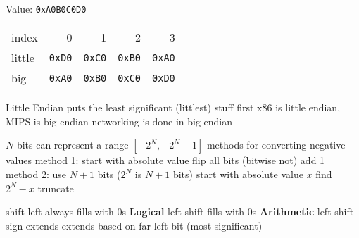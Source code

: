 \documentclass[12pt]{article}
\begin{document}
\begin{spacing}{0.8}
\begin{multicols*}{2}
\begin{flushleft}
\begin{outline}[longenum]

\\
Value: \verb|0xA0B0C0D0|\\
  \1 
  \begin{tabular}{l r r r r}
  index  & 0 & 1 & 2 & 3 \\
  little & \verb|0xD0| & \verb|0xC0| & \verb|0xB0| & \verb|0xA0| \\
  big    & \verb|0xA0| & \verb|0xB0| & \verb|0xC0| & \verb|0xD0| \\
  \end{tabular}
    \2 Little Endian puts the least significant (littlest) stuff first
  \1 x86 is little endian, MIPS is big endian
  \1 networking is done in big endian

  \1 $N$ bits can represent a range $[ -2^N, +2^N - 1 ]$
  \1 methods for converting negative values
  \1 method 1:
    \2 start with absolute value
    \2 flip all bits (bitwise not)
    \2 add 1
  \1 method 2:
    \2 use $N+1$ bits ($2^N$ is $N+1$ bits)
    \2 start with absolute value $x$
    \2 find $2^N - x$
    \2 truncate

  \1 shift left always fills with 0s
  \1 \textbf{Logical} left shift fills with 0s
  \1 \textbf{Arithmetic} left shift sign-extends
    \2 extends based on far left bit (most significant)
 

\end{outline}
\end{flushleft}
\end{multicols*}
\end{spacing}
\end{document}
